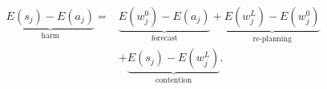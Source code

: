 \documentclass[border=2pt,varwidth=9cm]{standalone}
\begin{document}
$\displaystyle \begin{aligned}
\underbrace{E(s_j)-E(a_j)}_{\text{harm}} ={}&
\underbrace{E(w^0_j)-E(a_j)}_{\text{forecast}} +
\underbrace{E(w^L_j)-E(w^0_j)}_{\text{re-planning}}\\
&+ \underbrace{E(s_j)-E(w^L_j)}_{\text{contention}} .
\end{aligned}$
\end{document}
